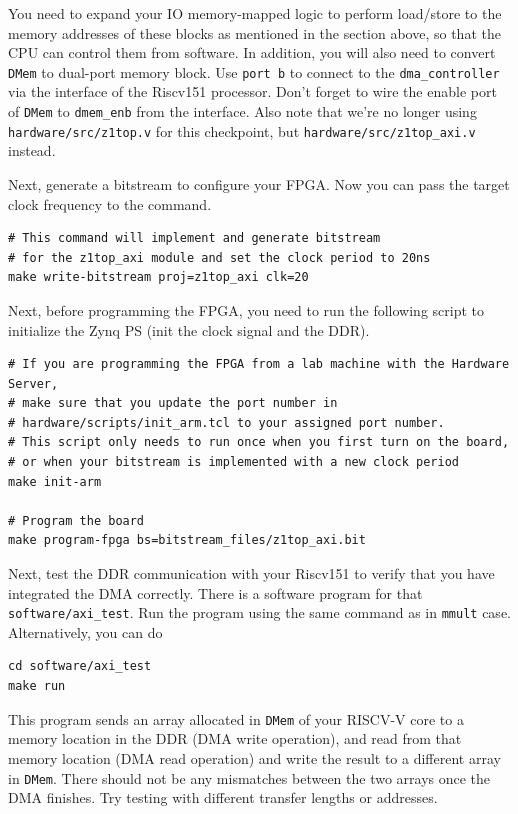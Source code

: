 \documentclass[11pt]{article}
\begin{document}
You need to expand your IO memory-mapped logic to perform load/store to the memory addresses of these blocks as mentioned in the section above,
so that the CPU can control them from software. In addition, you will also need to convert \texttt{DMem} to dual-port memory block.
Use \texttt{port b} to connect to the \texttt{dma\_controller} via the interface of the Riscv151 processor.
Don't forget to wire the enable port of \texttt{DMem} to \texttt{dmem\_enb} from the interface.
Also note that we're no longer using \verb|hardware/src/z1top.v| for this checkpoint, but \verb|hardware/src/z1top_axi.v| instead.

Next, generate a bitstream to configure your FPGA. Now you can pass the target clock frequency to the command.

\begin{verbatim}
# This command will implement and generate bitstream
# for the z1top_axi module and set the clock period to 20ns
make write-bitstream proj=z1top_axi clk=20
\end{verbatim}

Next, before programming the FPGA, you need to run the following script to initialize the Zynq PS (init the clock signal and the DDR).

\begin{verbatim}
# If you are programming the FPGA from a lab machine with the Hardware Server,
# make sure that you update the port number in
# hardware/scripts/init_arm.tcl to your assigned port number.
# This script only needs to run once when you first turn on the board,
# or when your bitstream is implemented with a new clock period
make init-arm

# Program the board
make program-fpga bs=bitstream_files/z1top_axi.bit
\end{verbatim}

Next, test the DDR communication with your Riscv151 to verify that you have integrated the DMA correctly. There is a software program for that \verb|software/axi_test|. Run the program using the same command as in \texttt{mmult} case. Alternatively, you can do

\begin{verbatim}
cd software/axi_test
make run
\end{verbatim}

This program sends an array allocated in \texttt{DMem} of your RISCV-V core to a memory location in the DDR (DMA write operation), and read from that memory location (DMA read operation) and write the result to a different array in \texttt{DMem}. There should not be any mismatches between the two arrays once the DMA finishes. Try testing with different transfer lengths or addresses.
\end{document}
